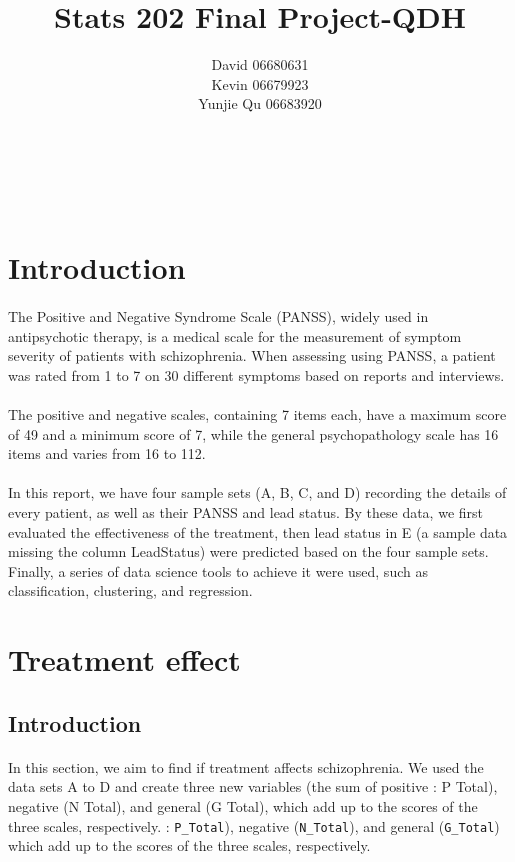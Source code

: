 \documentclass{article}
\title{Stats 202 Final Project-QDH}
\author{David 06680631\\
        Kevin 06679923\\
        Yunjie Qu 06683920\\
        }
\begin{document}
\maketitle 

\tableofcontents
~\\
~\\
\section{Introduction}
\paragraph{} The Positive and Negative Syndrome Scale (PANSS), widely used in antipsychotic therapy, is a medical scale for the measurement of symptom severity of patients with schizophrenia. When assessing using PANSS, a patient was rated from 1 to 7 on 30 different symptoms based on reports and interviews. 
\paragraph{} The positive and negative scales, containing 7 items each, have a maximum score of 49 and a minimum score of 7, while the general psychopathology scale has 16 items and varies from 16 to 112. 

\paragraph{} In this report, we have four sample sets (A, B, C, and D) recording the details of every patient, as well as their PANSS and lead status. By these data, we first evaluated the effectiveness of the treatment, then lead status in E (a sample data missing the column LeadStatus) were predicted based on the four sample sets. Finally, a series of data science tools to achieve it were used, such as classification, clustering, and regression.

\section{Treatment effect}
\subsection{Introduction}
\paragraph{}In this section, we aim to find if treatment affects schizophrenia. We used the data sets A to D and create three new variables (the sum of positive : P Total), negative (N Total), and general (G Total), which add up to the scores of the three scales, respectively. 
 : \texttt{P\_Total}), negative (\texttt{N\_Total}), and general (\texttt{G\_Total}) which add up to the scores of the three scales, respectively.
\end{document}
